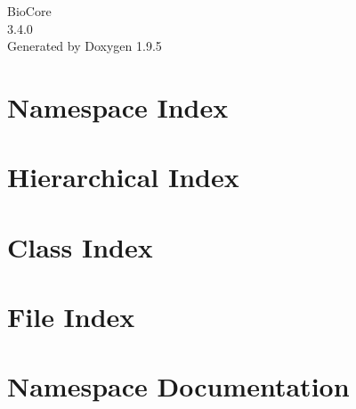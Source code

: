 \documentclass[twoside]{book}
\newcommand{\+}{\discretionary{\mbox{\scriptsize$\hookleftarrow$}}{}{}}
\newcommand{\clearemptydoublepage}{%
    \newpage{\pagestyle{empty}\cleardoublepage}%
  }
\begin{document}
  \raggedbottom
    \hypersetup{pageanchor=false,
                bookmarksnumbered=true,
                pdfencoding=unicode
               }
  \begin{titlepage}
  \vspace*{7cm}
  \begin{center}%
  {\Large Bio\+Core}\\
  [1ex]\large 3.\+4.\+0 \\
  \vspace*{1cm}
  {\large Generated by Doxygen 1.9.5}\\
  \end{center}
  \end{titlepage}
  \clearemptydoublepage
  \tableofcontents
  \clearemptydoublepage
  \hypersetup{pageanchor=true}
\chapter{Namespace Index}

\chapter{Hierarchical Index}

\chapter{Class Index}

\chapter{File Index}

\chapter{Namespace Documentation}


\end{document}
